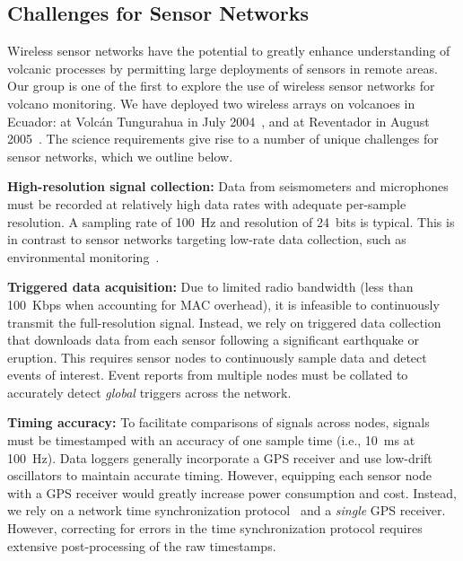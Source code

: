 \subsection{Challenges for Sensor Networks}

Wireless sensor networks have the potential to greatly enhance understanding
of volcanic processes by permitting large deployments of sensors in remote
areas.  Our group is one of the first to explore the use of wireless sensor
networks for volcano monitoring. We have deployed two wireless arrays on
volcanoes in Ecuador: at Volc\'{a}n Tungurahua in July
2004~\cite{volcano-ewsn05}, and at Reventador in August
2005~\cite{volcano-ieeeic06}.  The science requirements give rise to a number
of unique challenges for sensor networks, which we outline below.

{\bf High-resolution signal collection:}
Data from seismometers and microphones must be recorded at relatively high
data rates with adequate per-sample resolution.  A sampling rate of 100~Hz
and resolution of 24~bits is typical.  This is in contrast to sensor networks
targeting low-rate data collection, such as environmental
monitoring~\cite{gdi-sensys04,berkeley-redwoods}.

{\bf Triggered data acquisition:}
Due to limited radio bandwidth (less than 100~Kbps when accounting for MAC
overhead), it is infeasible to continuously transmit the full-resolution
signal.  Instead, we rely on triggered data collection that downloads data
from each sensor following a significant earthquake or eruption. This
requires sensor nodes to continuously sample data and detect events of
interest.  Event reports from multiple nodes must be collated to accurately
detect {\em global} triggers across the network.

{\bf Timing accuracy:} 
To facilitate comparisons of signals across nodes, signals must be
timestamped with an accuracy of one sample time (i.e., 10~ms at 100~Hz).
Data loggers generally incorporate a GPS receiver and use low-drift
oscillators to maintain accurate timing. However, equipping each sensor node
with a GPS receiver would greatly increase power consumption and cost.
Instead, we rely on a network time synchronization protocol~\cite{rbs,ftsp}
and a {\em single} GPS receiver. However, correcting for errors in the time
synchronization protocol requires extensive post-processing of the raw
timestamps.



